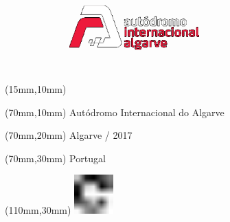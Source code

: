 \begin{textblock*}{50mm}(15mm,10mm)%
\includegraphics[width=50mm]{LG/ALG.png}
\end{textblock*}
\begin{textblock*}{130mm}(70mm,10mm)%
{\fontsize{20}{20}\selectfont Autódromo Internacional do Algarve}\\
\end{textblock*}
\begin{textblock*}{120mm}(70mm,20mm)%
{\fontsize{16}{16}\selectfont Algarve / 2017}\\
\end{textblock*}
\begin{textblock*}{120mm}(70mm,30mm)%
{\fontsize{12}{12}\selectfont Portugal}
\end{textblock*}
\begin{textblock*}{30mm}(110mm,30mm)%
\centering
\includegraphics[height=15mm]{icons/fa-rotate-right.pdf}
\end{textblock*}
